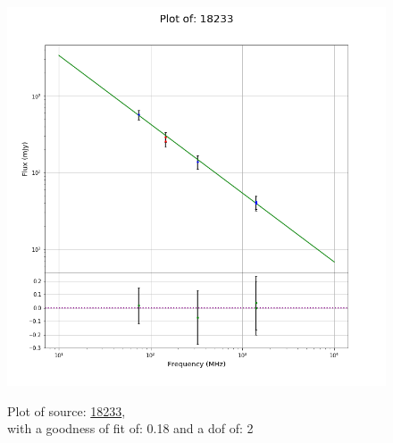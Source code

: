 \documentclass{article}
\begin{document}
\begin{figure}[H]
    \centering
    \begin{minipage}{.5\textwidth}
        \centering
        \includegraphics[scale = 0.35]{KmeulenTrap4P23_1min/1min18233.png}
        \captionsetup{labelformat=empty}
        \caption{Plot of source: \href{http://banana.transientskp.org/r4/vlo_KmeulenTrap4P23/runningcatalog/18233}{18233},\\with a goodness of fit of: 0.18 and a dof of: 2}
        \addtocounter{figure}{-1}
        \label{KmeulenTrap4P23:1min:18233:plot}
    \end{minipage}%
    \begin{minipage}{0.5\textwidth}
        \centering


\end{minipage}
\end{figure}
\end{document}

